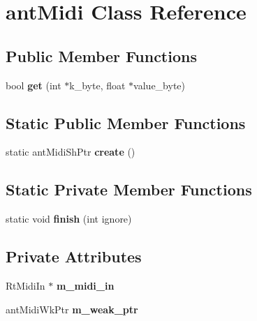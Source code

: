 \hypertarget{classant_midi}{\section{ant\+Midi Class Reference}
\label{classant_midi}
}
\subsection*{Public Member Functions}
\begin{DoxyCompactItemize}
\item 
\hypertarget{classant_midi_a971e0aeabc8cdf1920c5d61e7a0382c1}{bool {\bfseries get} (int $\ast$k\+\_\+byte, float $\ast$value\+\_\+byte)}\label{classant_midi_a971e0aeabc8cdf1920c5d61e7a0382c1}

\end{DoxyCompactItemize}
\subsection*{Static Public Member Functions}
\begin{DoxyCompactItemize}
\item 
\hypertarget{classant_midi_afbcec4b5057c75d7a9d672e4f8fffcda}{static ant\+Midi\+Sh\+Ptr {\bfseries create} ()}\label{classant_midi_afbcec4b5057c75d7a9d672e4f8fffcda}

\end{DoxyCompactItemize}
\subsection*{Static Private Member Functions}
\begin{DoxyCompactItemize}
\item 
\hypertarget{classant_midi_ae0f690b6cebaeed51f3559d72b5aa0d3}{static void {\bfseries finish} (int ignore)}\label{classant_midi_ae0f690b6cebaeed51f3559d72b5aa0d3}

\end{DoxyCompactItemize}
\subsection*{Private Attributes}
\begin{DoxyCompactItemize}
\item 
\hypertarget{classant_midi_ad89992ccbdf6d5d4a8be2a9f32ed71ab}{Rt\+Midi\+In $\ast$ {\bfseries m\+\_\+midi\+\_\+in}}\label{classant_midi_ad89992ccbdf6d5d4a8be2a9f32ed71ab}

\item 
\hypertarget{classant_midi_ae055bf54fa6007f3ae895d28bc020766}{ant\+Midi\+Wk\+Ptr {\bfseries m\+\_\+weak\+\_\+ptr}}\label{classant_midi_ae055bf54fa6007f3ae895d28bc020766}

\end{DoxyCompactItemize}

